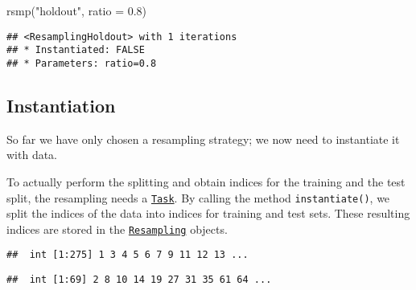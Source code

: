 \documentclass[
]{scrbook}
\newenvironment{Shaded}{\begin{snugshade}}{\end{snugshade}}
\newcommand{\AttributeTok}[1]{\textcolor[rgb]{0.77,0.63,0.00}{#1}}
\newcommand{\DecValTok}[1]{\textcolor[rgb]{0.00,0.00,0.81}{#1}}
\newcommand{\FloatTok}[1]{\textcolor[rgb]{0.00,0.00,0.81}{#1}}
\newcommand{\FunctionTok}[1]{\textcolor[rgb]{0.00,0.00,0.00}{#1}}
\newcommand{\NormalTok}[1]{#1}
\newcommand{\SpecialCharTok}[1]{\textcolor[rgb]{0.00,0.00,0.00}{#1}}
\newcommand{\StringTok}[1]{\textcolor[rgb]{0.31,0.60,0.02}{#1}}
\renewenvironment{Shaded} {\begin{snugshade}\small} {\end{snugshade}}
\begin{document}
\begin{Shaded}
\begin{Highlighting}[]
\FunctionTok{rsmp}\NormalTok{(}\StringTok{"holdout"}\NormalTok{, }\AttributeTok{ratio =} \FloatTok{0.8}\NormalTok{)}
\end{Highlighting}
\end{Shaded}

\begin{verbatim}
## <ResamplingHoldout> with 1 iterations
## * Instantiated: FALSE
## * Parameters: ratio=0.8
\end{verbatim}

\hypertarget{resampling-inst}{%
\subsection{Instantiation}\label{resampling-inst}}

So far we have only chosen a resampling strategy; we now need to instantiate it with data.

To actually perform the splitting and obtain indices for the training and the test split, the resampling needs a \href{https://mlr3.mlr-org.com/reference/Task.html}{\texttt{Task}}.
By calling the method \texttt{instantiate()}, we split the indices of the data into indices for training and test sets.
These resulting indices are stored in the \href{https://mlr3.mlr-org.com/reference/Resampling.html}{\texttt{Resampling}} objects.

\begin{Shaded}
\end{Shaded}

\begin{verbatim}
##  int [1:275] 1 3 4 5 6 7 9 11 12 13 ...
\end{verbatim}

\begin{Shaded}
\end{Shaded}

\begin{verbatim}
##  int [1:69] 2 8 10 14 19 27 31 35 61 64 ...
\end{verbatim}
\end{document}
